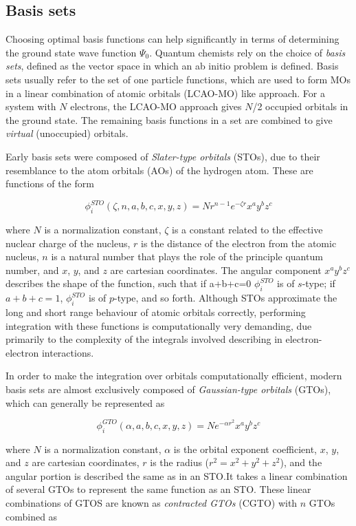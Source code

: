 \subsection{Basis sets}

Choosing optimal basis functions can help significantly in terms of determining
the ground state wave function $\Psi_0$. Quantum chemists rely on the choice of
\emph{basis sets}, defined as the vector space in which an ab initio problem is
defined. Basis sets usually refer to the set of one particle functions, which
are used to form MOs in a linear combination of atomic orbitals (LCAO-MO) like
approach. For a system with $N$ electrons, the LCAO-MO approach gives $N$/2
occupied orbitals in the ground state. The remaining basis functions in a set
are combined to give \emph{virtual} (unoccupied) orbitals.

Early basis sets were composed of \emph{Slater-type orbitals} (STOs), due to
their resemblance to the atom orbitals (AOs) of the hydrogen atom. These are
functions of the form

\begin{equation}
\phi_i^{STO}(\zeta,n,a,b,c,x,y,z) = Nr^{n-1}e^{-\zeta r}x^a y^b z^c
\end{equation}

\noindent where $N$ is a normalization constant, $\zeta$ is a constant related
to the effective nuclear charge of the nucleus, $r$ is the distance of the
electron from the atomic nucleus, $n$ is a natural number that plays the role
of the principle quantum number, and $x$, $y$, and $z$ are cartesian
coordinates. The angular component $x^a y^b z^c$ describes the shape of the
function, such that if a+b+c=0 $\phi_i^{STO}$ is of $s$-type; if $a+b+c=1$,
$\phi_i^{STO}$ is of $p$-type, and so forth. Although STOs approximate the long
and short range behaviour of atomic orbitals correctly, performing integration
with these functions is computationally very demanding, due primarily to the
complexity of the integrals involved describing in electron-electron
interactions.

In order to make the integration over orbitals computationally efficient,
modern basis sets are almost exclusively composed of \emph{Gaussian-type
orbitals} (GTOs), which can generally be represented as

\begin{equation}
\phi_i^{GTO}(\alpha,a,b,c,x,y,z) = N e^{-\alpha r^2} x^a y^b z^c
\end{equation}

\noindent where $N$ is a normalization constant, $\alpha$ is the orbital
exponent coefficient, $x$, $y$, and $z$ are cartesian coordinates, $r$ is the
radius ($r^2=x^2+y^2+z^2$), and the angular portion is described the same as in
an STO.\@ It takes a linear combination of several GTOs to represent the same
function as an STO. These linear combinations of GTOS are known as
\emph{contracted GTOs} (CGTO) with $n$ GTOs combined as

